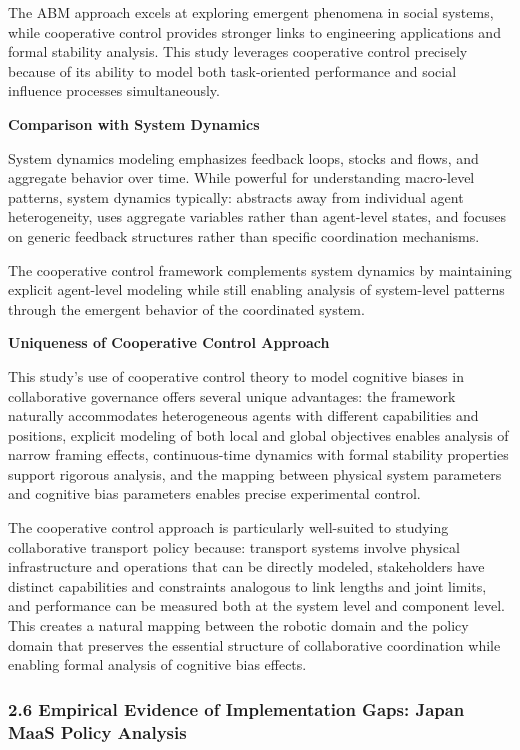 The ABM approach excels at exploring emergent phenomena in social
systems, while cooperative control provides stronger links to
engineering applications and formal stability analysis. This study
leverages cooperative control precisely because of its ability to model
both task-oriented performance and social influence processes
simultaneously.

\textbf{Comparison with System Dynamics}

System dynamics modeling emphasizes feedback loops, stocks and flows,
and aggregate behavior over time. While powerful for understanding
macro-level patterns, system dynamics typically: abstracts away from
individual agent heterogeneity, uses aggregate variables rather than
agent-level states, and focuses on generic feedback structures rather
than specific coordination mechanisms.

The cooperative control framework complements system dynamics by
maintaining explicit agent-level modeling while still enabling analysis
of system-level patterns through the emergent behavior of the
coordinated system.

\textbf{Uniqueness of Cooperative Control Approach}

This study's use of cooperative control theory to model cognitive biases
in collaborative governance offers several unique advantages: the
framework naturally accommodates heterogeneous agents with different
capabilities and positions, explicit modeling of both local and global
objectives enables analysis of narrow framing effects, continuous-time
dynamics with formal stability properties support rigorous analysis, and
the mapping between physical system parameters and cognitive bias
parameters enables precise experimental control.

The cooperative control approach is particularly well-suited to studying
collaborative transport policy because: transport systems involve
physical infrastructure and operations that can be directly modeled,
stakeholders have distinct capabilities and constraints analogous to
link lengths and joint limits, and performance can be measured both at
the system level and component level. This creates a natural mapping
between the robotic domain and the policy domain that preserves the
essential structure of collaborative coordination while enabling formal
analysis of cognitive bias effects.

\subsubsection{2.6 Empirical Evidence of Implementation Gaps: Japan MaaS
Policy
Analysis}\label{empirical-evidence-of-implementation-gaps-japan-maas-policy-analysis}

